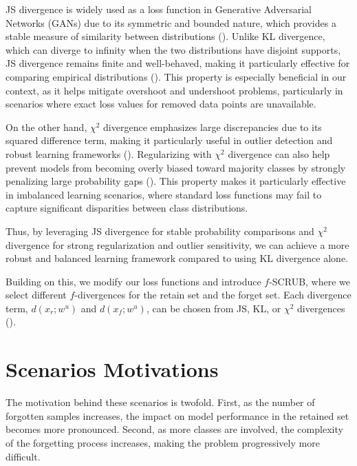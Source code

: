 \documentclass{article} %
\begin{document}
JS divergence is widely used as a loss function in Generative Adversarial Networks (GANs) due to its symmetric and bounded nature, which provides a stable measure of similarity between distributions (\cite{goodfellow2014generativeadversarialnetworks}). Unlike KL divergence, which can diverge to infinity when the two distributions have disjoint supports, JS divergence remains finite and well-behaved, making it particularly effective for comparing empirical distributions (\cite{nowozin2016fgantraininggenerativeneural}). This property is especially beneficial in our context, as it helps mitigate overshoot and undershoot problems, particularly in scenarios where exact loss values for removed data points are unavailable.

On the other hand, $\chi^2$ divergence emphasizes large discrepancies due to its squared difference term, making it particularly useful in outlier detection and robust learning frameworks (\cite{reid2009informationdivergenceriskbinary}). Regularizing with $\chi^2$ divergence can also help prevent models from becoming overly biased toward majority classes by strongly penalizing large probability gaps (\cite{duchi2020learningmodelsuniformperformance}). This property makes it particularly effective in imbalanced learning scenarios, where standard loss functions may fail to capture significant disparities between class distributions.

Thus, by leveraging JS divergence for stable probability comparisons and $\chi^2$ divergence for strong regularization and outlier sensitivity, we can achieve a more robust and balanced learning framework compared to using KL divergence alone.

Building on this, we modify our loss functions and introduce $f$-SCRUB, where we select different $f$-divergences for the retain set and the forget set. Each divergence term, $d(x_r; w^u)$ and $d(x_f; w^u)$, can be chosen from JS, KL, or $\chi^2$ divergences (\cite{Nguyen_2010}).

\section{Scenarios Motivations}\label{exp:Scenario}
The motivation behind these scenarios is twofold. First, as the number of forgotten samples increases, the impact on model performance in the retained set becomes more pronounced. Second, as more classes are involved, the complexity of the forgetting process increases, making the problem progressively more difficult.
\end{document}
